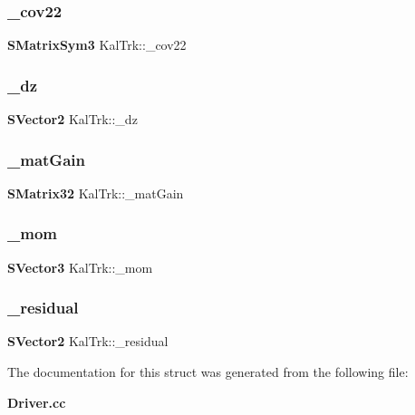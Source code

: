 \mbox{\label{structKalTrk_a837038f91a6ddc647be27ee528716cb3}} 
\subsubsection{\+\_\+cov22}
{\footnotesize\ttfamily \textbf{ S\+Matrix\+Sym3} Kal\+Trk\+::\+\_\+cov22}

\mbox{\label{structKalTrk_ae2fb8029c3d8db4efbe63d64a3cd00e5}} 
\subsubsection{\+\_\+dz}
{\footnotesize\ttfamily \textbf{ S\+Vector2} Kal\+Trk\+::\+\_\+dz}

\mbox{\label{structKalTrk_a2bfff6dfccbe953c600fbd432b4b1b26}} 
\subsubsection{\+\_\+mat\+Gain}
{\footnotesize\ttfamily \textbf{ S\+Matrix32} Kal\+Trk\+::\+\_\+mat\+Gain}

\mbox{\label{structKalTrk_a9e81bb1a9fc1fdd02b488a9e91ea1f71}} 
\subsubsection{\+\_\+mom}
{\footnotesize\ttfamily \textbf{ S\+Vector3} Kal\+Trk\+::\+\_\+mom}

\mbox{\label{structKalTrk_a532ae2ddc14325b61fbdc56b1b8777dc}} 
\subsubsection{\+\_\+residual}
{\footnotesize\ttfamily \textbf{ S\+Vector2} Kal\+Trk\+::\+\_\+residual}



The documentation for this struct was generated from the following file\+:\begin{DoxyCompactItemize}
\item 
\textbf{ Driver.\+cc}\end{DoxyCompactItemize}
